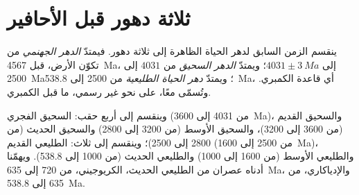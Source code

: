 \section{ثلاثة دهور قبل الأحافير}\label{sec:b2:precambrian-earth:eons}

\begin{definition}\label{def:b2:precambrian-earth:eons}
ينقسم الزمن السابق لدهر الحياة الظاهرة إلى ثلاثة دهور. فيمتدّ \emph{الدهر الجهنمي}
من تكوّن الأرض، قبل \qty{4567}{Ma}، إلى $4031 \pm \qty{3}{Ma}$؛ ويمتدّ
\emph{الدهر السحيق} من $4031$ إلى \qty{2500}{Ma}؛ ويمتدّ
\emph{دهر الحياة الطليعية} من 2500 إلى \qty{538.8}{Ma}، أي قاعدة الكمبري.
وتُسمّى معًا، على نحو غير رسمي، ما قبل الكمبري.
\end{definition}

وينقسم  إلى أربع حقب: السحيق الفجري (من 4031 إلى \qty{3600}{Ma})، والسحيق القديم (من 3600
إلى 3200)، والسحيق الأوسط (من 3200 إلى 2800) والسحيق الحديث (من 2800 إلى 2500)؛ وينقسم  إلى ثلاث:
الطليعي القديم (من 2500 إلى \qty{1600}{Ma})، والطليعي الأوسط (من 1600 إلى 1000)
والطليعي الحديث (من 1000 إلى 538.8). ويهمّنا أدناه عصران من الطليعي الحديث، الكريوجيني، من 720 إلى
\qty{635}{Ma}، والإدياكاري، من 635 إلى \qty{538.8}{Ma}.

